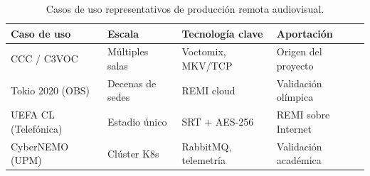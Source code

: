 \begin{table}[H]
  \centering
  \caption{Casos de uso representativos de producción remota audiovisual.}
  \label{tab:casos_uso_remi}
  \small
  \begin{tabular}{|l|l|l|l|}
    \hline
    \textbf{Caso de uso} & \textbf{Escala} & \textbf{Tecnología clave} & \textbf{Aportación} \\
    \hline
    CCC / C3VOC          & Múltiples salas   & Voctomix, MKV/TCP    & Origen del proyecto \\
    Tokio 2020 (OBS)     & Decenas de sedes  & REMI cloud           & Validación olímpica \\
    UEFA CL (Telefónica) & Estadio único     & SRT + AES-256        & REMI sobre Internet \\
    CyberNEMO (UPM)      & Clúster K8s       & RabbitMQ, telemetría & Validación académica \\
    \hline
  \end{tabular}
\end{table}
